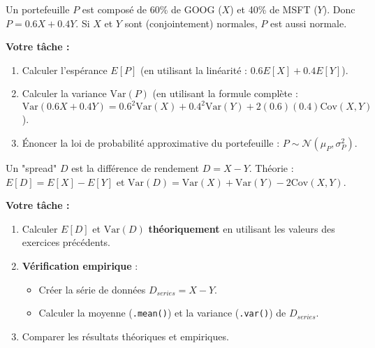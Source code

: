 \begin{exercicebox}
Un portefeuille $P$ est composé de 60\% de GOOG ($X$) et 40\% de MSFT ($Y$). Donc $P = 0.6X + 0.4Y$.
Si $X$ et $Y$ sont (conjointement) normales, $P$ est aussi normale.

\textbf{Votre tâche :}
\begin{enumerate}
    \item Calculer l'espérance $E[P]$ (en utilisant la linéarité : $0.6E[X] + 0.4E[Y]$).
    \item Calculer la variance $\text{Var}(P)$ (en utilisant la formule complète : $\text{Var}(0.6X + 0.4Y) = 0.6^2\text{Var}(X) + 0.4^2\text{Var}(Y) + 2(0.6)(0.4)\text{Cov}(X,Y)$).
    \item Énoncer la loi de probabilité approximative du portefeuille : $P \sim \mathcal{N}(\mu_P, \sigma_P^2)$.
\end{enumerate}
\end{exercicebox}

\begin{exercicebox}
Un "spread" $D$ est la différence de rendement $D = X - Y$.
Théorie : $E[D] = E[X] - E[Y]$ et $\text{Var}(D) = \text{Var}(X) + \text{Var}(Y) - 2\text{Cov}(X,Y)$.

\textbf{Votre tâche :}
\begin{enumerate}
    \item Calculer $E[D]$ et $\text{Var}(D)$ \textbf{théoriquement} en utilisant les valeurs des exercices précédents.
    \item \textbf{Vérification empirique} :
        \begin{itemize}
            \item Créer la série de données $D_{series} = X - Y$.
            \item Calculer la moyenne (\texttt{.mean()}) et la variance (\texttt{.var()}) de $D_{series}$.
        \end{itemize}
    \item Comparer les résultats théoriques et empiriques.
\end{enumerate}
\end{exercicebox}